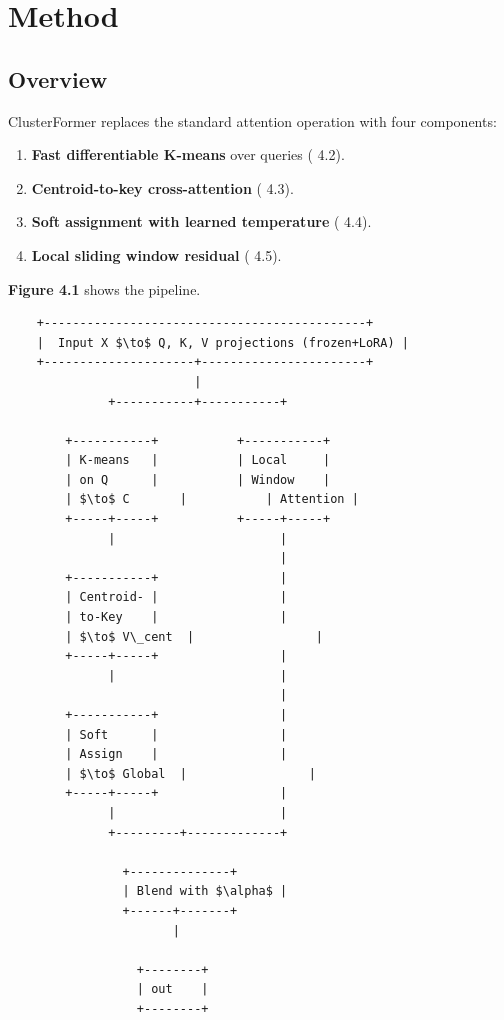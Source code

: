 \section{Method}

\subsection{Overview}

ClusterFormer replaces the standard attention operation with four 
components:

\begin{enumerate}
\item \textbf{Fast differentiable K-means} over queries ( 4.2).
\item \textbf{Centroid-to-key cross-attention} ( 4.3).
\item \textbf{Soft assignment with learned temperature} ( 4.4).
\item \textbf{Local sliding window residual} ( 4.5).

\end{enumerate}
\textbf{Figure 4.1} shows the pipeline.

\begin{lstlisting}
    +---------------------------------------------+
    |  Input X $\to$ Q, K, V projections (frozen+LoRA) |
    +---------------------+-----------------------+
                          |
              +-----------+-----------+
                                       
        +-----------+           +-----------+
        | K-means   |           | Local     |
        | on Q      |           | Window    |
        | $\to$ C       |           | Attention |
        +-----+-----+           +-----+-----+
              |                       |
                                      |
        +-----------+                 |
        | Centroid- |                 |
        | to-Key    |                 |
        | $\to$ V\_cent  |                 |
        +-----+-----+                 |
              |                       |
                                      |
        +-----------+                 |
        | Soft      |                 |
        | Assign    |                 |
        | $\to$ Global  |                 |
        +-----+-----+                 |
              |                       |
              +---------+-------------+
                         
                +--------------+
                | Blend with $\alpha$ |
                +------+-------+
                       |
                        
                  +--------+
                  | out    |
                  +--------+
\end{lstlisting}

